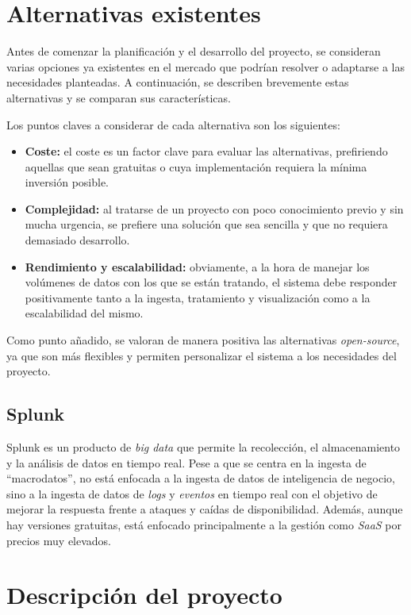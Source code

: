 \section{Alternativas existentes}\label{sec:alternativas}
Antes de comenzar la planificación y el desarrollo del proyecto, se consideran varias opciones
ya existentes en el mercado que podrían resolver o adaptarse a las necesidades planteadas. A
continuación, se describen brevemente estas alternativas y se comparan sus características.

Los puntos claves a considerar de cada alternativa son los siguientes:
\begin{itemize}
	\item \textbf{Coste:} el coste es un factor clave para evaluar las alternativas, prefiriendo
		aquellas que sean gratuitas o cuya implementación requiera la mínima inversión posible.
	\item \textbf{Complejidad:} al tratarse de un proyecto con poco conocimiento previo y sin
		mucha urgencia, se prefiere una solución que sea sencilla y que no requiera demasiado
		desarrollo.
	\item \textbf{Rendimiento y escalabilidad:} obviamente, a la hora de manejar los volúmenes
		de datos con los que se están tratando, el sistema debe responder positivamente tanto
		a la ingesta, tratamiento y visualización como a la escalabilidad del mismo.
\end{itemize}

Como punto añadido, se valoran de manera positiva las alternativas \textit{open-source}, ya
que son más flexibles y permiten personalizar el sistema a los necesidades del proyecto.

\subsection{Splunk}
Splunk es un producto de \textit{big data} que permite la recolección, el almacenamiento y la
análisis de datos en tiempo real. Pese a que se centra en la ingesta de ``macrodatos'', no
está enfocada a la ingesta de datos de inteligencia de negocio, sino a la ingesta de datos
de \textit{logs} y \textit{eventos} en tiempo real con el objetivo de mejorar la respuesta
frente a ataques y caídas de disponibilidad. Además, aunque hay versiones gratuitas, está
enfocado principalmente a la gestión como \textit{SaaS} por precios muy elevados.



\newpage{}
\section{Descripción del proyecto}\label{sec:descripcion}

